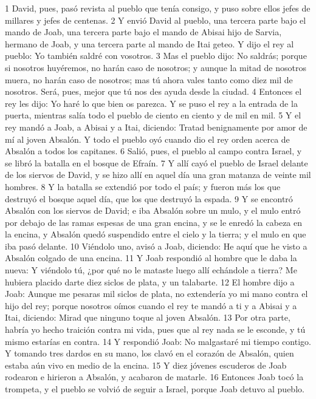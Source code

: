 1 David, pues, pasó revista al pueblo que tenía consigo, y puso sobre ellos jefes de millares y jefes de centenas.
2 Y envió David al pueblo, una tercera parte bajo el mando de Joab, una tercera parte bajo el mando de Abisai hijo de Sarvia, hermano de Joab, y una tercera parte al mando de Itai geteo. Y dijo el rey al pueblo: Yo también saldré con vosotros.
3 Mas el pueblo dijo: No saldrás; porque si nosotros huyéremos, no harán caso de nosotros; y aunque la mitad de nosotros muera, no harán caso de nosotros; mas tú ahora vales tanto como diez mil de nosotros. Será, pues, mejor que tú nos des ayuda desde la ciudad.
4 Entonces el rey les dijo: Yo haré lo que bien os parezca. Y se puso el rey a la entrada de la puerta, mientras salía todo el pueblo de ciento en ciento y de mil en mil.
5 Y el rey mandó a Joab, a Abisai y a Itai, diciendo: Tratad benignamente por amor de mí al joven Absalón. Y todo el pueblo oyó cuando dio el rey orden acerca de Absalón a todos los capitanes.
6 Salió, pues, el pueblo al campo contra Israel, y se libró la batalla en el bosque de Efraín.
7 Y allí cayó el pueblo de Israel delante de los siervos de David, y se hizo allí en aquel día una gran matanza de veinte mil hombres.
8 Y la batalla se extendió por todo el país; y fueron más los que destruyó el bosque aquel día, que los que destruyó la espada.
9 Y se encontró Absalón con los siervos de David; e iba Absalón sobre un mulo, y el mulo entró por debajo de las ramas espesas de una gran encina, y se le enredó la cabeza en la encina, y Absalón quedó suspendido entre el cielo y la tierra; y el mulo en que iba pasó delante.
10 Viéndolo uno, avisó a Joab, diciendo: He aquí que he visto a Absalón colgado de una encina.
11 Y Joab respondió al hombre que le daba la nueva: Y viéndolo tú, ¿por qué no le mataste luego allí echándole a tierra? Me hubiera placido darte diez siclos de plata,  y un talabarte.
12 El hombre dijo a Joab: Aunque me pesaras mil siclos de plata,  no extendería yo mi mano contra el hijo del rey; porque nosotros oímos cuando el rey te mandó a ti y a Abisai y a Itai, diciendo: Mirad que ninguno toque al joven Absalón.
13 Por otra parte, habría yo hecho traición contra mi vida, pues que al rey nada se le esconde, y tú mismo estarías en contra. 
14 Y respondió Joab: No malgastaré mi tiempo contigo. Y tomando tres dardos en su mano, los clavó en el corazón de Absalón, quien estaba aún vivo en medio de la encina.
15 Y diez jóvenes escuderos de Joab rodearon e hirieron a Absalón, y acabaron de matarle.
16 Entonces Joab tocó la trompeta, y el pueblo se volvió de seguir a Israel, porque Joab detuvo al pueblo.
